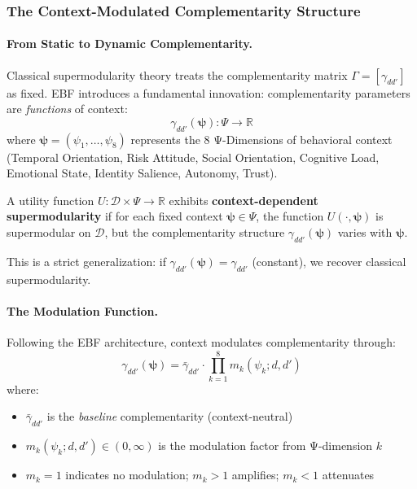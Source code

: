 \subsubsection{The Context-Modulated Complementarity Structure}

\paragraph{From Static to Dynamic Complementarity.}

Classical supermodularity theory treats the complementarity matrix $\Gamma = [\gamma_{dd'}]$ 
as fixed. EBF introduces a fundamental innovation: complementarity parameters 
are \emph{functions} of context:
\begin{equation}
\gamma_{dd'}(\boldsymbol{\psi}) : \Psi \to \mathbb{R}
\label{eq:context-gamma}
\end{equation}
where $\boldsymbol{\psi} = (\psi_1, \ldots, \psi_8)$ represents the 8 Ψ-Dimensions 
of behavioral context (Temporal Orientation, Risk Attitude, Social Orientation, 
Cognitive Load, Emotional State, Identity Salience, Autonomy, Trust).

\begin{definition}
\label{def:context-supermodular}
A utility function $U: \mathcal{D} \times \Psi \to \mathbb{R}$ exhibits 
\textbf{context-dependent supermodularity} if for each fixed context 
$\boldsymbol{\psi} \in \Psi$, the function $U(\cdot, \boldsymbol{\psi})$ 
is supermodular on $\mathcal{D}$, but the complementarity structure 
$\gamma_{dd'}(\boldsymbol{\psi})$ varies with $\boldsymbol{\psi}$.
\end{definition}

This is a strict generalization: if $\gamma_{dd'}(\boldsymbol{\psi}) = \gamma_{dd'}$ 
(constant), we recover classical supermodularity.

\paragraph{The Modulation Function.}

Following the EBF architecture, context modulates complementarity through:
\begin{equation}
\gamma_{dd'}(\boldsymbol{\psi}) = \bar{\gamma}_{dd'} \cdot 
\prod_{k=1}^{8} m_k(\psi_k; d, d')
\label{eq:modulation}
\end{equation}
where:
\begin{itemize}
    \item $\bar{\gamma}_{dd'}$ is the \emph{baseline} complementarity (context-neutral)
    \item $m_k(\psi_k; d, d') \in (0, \infty)$ is the modulation factor from Ψ-dimension $k$
    \item $m_k = 1$ indicates no modulation; $m_k > 1$ amplifies; $m_k < 1$ attenuates
\end{itemize}

